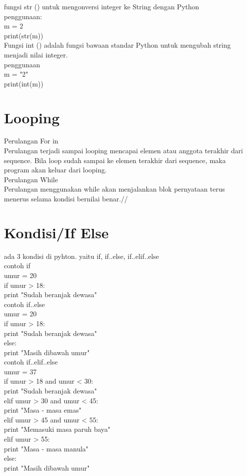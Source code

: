 fungsi  str () untuk mengonversi integer ke String dengan Python\\
penggunaan: \\
m = 2\\
print(str(m))\\

Fungsi  int () adalah fungsi  bawaan standar Python untuk mengubah string menjadi nilai integer.\\
penggunaan\\
m = "2"\\
print(int(m))\\

\section{Looping}
Perulangan For in\\
Perulangan terjadi sampai looping mencapai elemen atau anggota terakhir dari sequence. Bila loop sudah sampai ke elemen terakhir dari sequence, maka program akan keluar dari looping.\\

Perulangan While\\
Perulangan menggunakan while akan menjalankan blok pernyataan terus menerus selama kondisi bernilai benar.//

\section{Kondisi/If Else}
ada 3 kondisi di pyhton. yaitu if, if..else, if..elif..else\\

contoh if\\
umur = 20\\
if umur > 18:\\
    print "Sudah beranjak dewasa"\\

contoh if..else\\
umur = 20\\
if umur > 18:\\
    print "Sudah beranjak dewasa"\\
else:\\
    print "Masih dibawah umur"\\
    
contoh if..elif..else\\
umur = 37\\
if umur > 18 and umur < 30:\\
    print "Sudah beranjak dewasa"\\
elif umur > 30 and umur < 45:\\
    print "Masa - masa emas"\\
elif umur > 45 and umur < 55:\\
    print "Memasuki masa paruh baya"\\
elif umur > 55:\\
    print "Masa - masa manula"\\
else:\\
    print "Masih dibawah umur"\\

